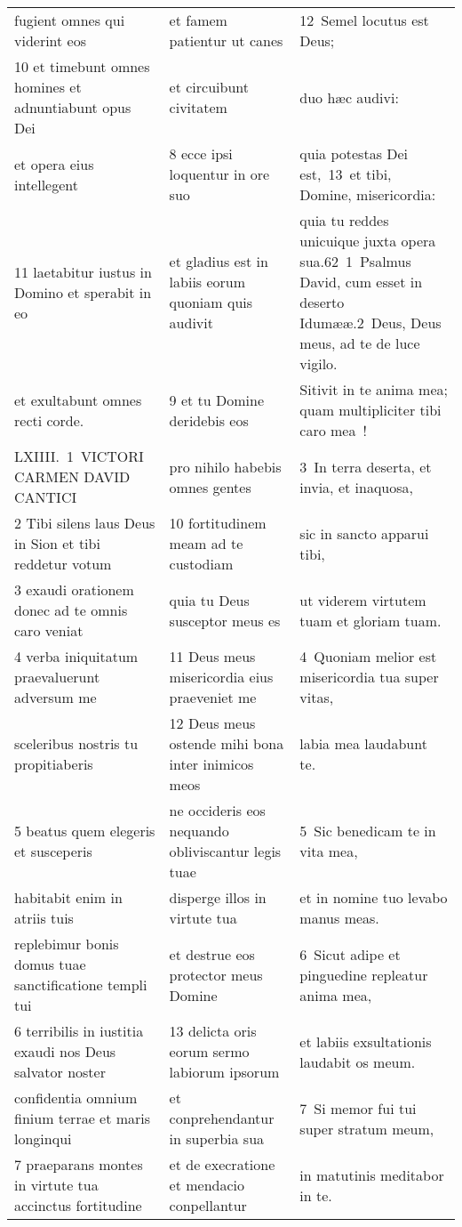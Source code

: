 \documentclass{article}
\begin{document}
\begin{longtable}{@{}p{}p{}p{}@{}}
fugient omnes qui viderint eos	&	et famem patientur ut canes	&	12 Semel locutus est Deus;	\\
10 et timebunt omnes homines et adnuntiabunt opus Dei	&	et circuibunt civitatem	&	duo hæc audivi:	\\
et opera eius intellegent	&	8 ecce ipsi loquentur in ore suo	&	quia potestas Dei est, 13 et tibi, Domine, misericordia:	\\
11 laetabitur iustus in Domino et sperabit in eo	&	et gladius est in labiis eorum quoniam quis audivit	&	quia tu reddes unicuique juxta opera sua.62 1 Psalmus David, cum esset in deserto Idumææ.2 Deus, Deus meus, ad te de luce vigilo.	\\
et exultabunt omnes recti corde.	&	9 et tu Domine deridebis eos	&	Sitivit in te anima mea; quam multipliciter tibi caro mea !	\\
LXIIII. 1 VICTORI CARMEN DAVID CANTICI	&	pro nihilo habebis omnes gentes	&	3 In terra deserta, et invia, et inaquosa,	\\
2 Tibi silens laus Deus in Sion et tibi reddetur votum	&	10 fortitudinem meam ad te custodiam	&	sic in sancto apparui tibi,	\\
3 exaudi orationem donec ad te omnis caro veniat	&	quia tu Deus susceptor meus es	&	ut viderem virtutem tuam et gloriam tuam.	\\
4 verba iniquitatum praevaluerunt adversum me	&	11 Deus meus misericordia eius praeveniet me	&	4 Quoniam melior est misericordia tua super vitas,	\\
sceleribus nostris tu propitiaberis	&	12 Deus meus ostende mihi bona inter inimicos meos	&	labia mea laudabunt te.	\\
5 beatus quem elegeris et susceperis	&	ne occideris eos nequando obliviscantur legis tuae	&	5 Sic benedicam te in vita mea,	\\
habitabit enim in atriis tuis	&	disperge illos in virtute tua	&	et in nomine tuo levabo manus meas.	\\
replebimur bonis domus tuae sanctificatione templi tui	&	et destrue eos protector meus Domine	&	6 Sicut adipe et pinguedine repleatur anima mea,	\\
6 terribilis in iustitia exaudi nos Deus salvator noster	&	13 delicta oris eorum sermo labiorum ipsorum	&	et labiis exsultationis laudabit os meum.	\\
confidentia omnium finium terrae et maris longinqui	&	et conprehendantur in superbia sua	&	7 Si memor fui tui super stratum meum,	\\
7 praeparans montes in virtute tua accinctus fortitudine	&	et de execratione et mendacio conpellantur	&	in matutinis meditabor in te.	\\

\end{longtable}
\end{document}
